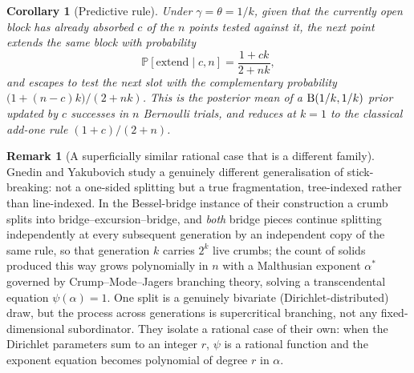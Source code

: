 \documentclass[11pt]{article}
\newcommand{\PP}{\mathbb{P}}
\theoremstyle{plain}
\newtheorem{corollary}[theorem]{Corollary}
\theoremstyle{definition}
\newtheorem{remark}[theorem]{Remark}
\begin{document}
\begin{corollary}[Predictive rule]
\label{cor:reciprocal-predictive}
Under \(\gamma=\theta=1/k\), given that the currently open block has already absorbed \(c\) of the \(n\) points tested against it, the next point extends the same block with probability
\[
\PP[\text{extend}\mid c,n]=\frac{1+ck}{2+nk},
\]
and escapes to test the next slot with the complementary probability \(\bigl(1+(n-c)k\bigr)/(2+nk)\). This is the posterior mean of a \({\rm B}(1/k,1/k)\) prior updated by \(c\) successes in \(n\) Bernoulli trials, and reduces at \(k=1\) to the classical add-one rule \((1+c)/(2+n)\).
\end{corollary}

\begin{remark}[A superficially similar rational case that is a different family]
\label{rem:gnedin-yakubovich}
Gnedin and Yakubovich \cite{gnedin2006recursive} study a genuinely different generalisation of stick-breaking: not a one-sided splitting but a true fragmentation, tree-indexed rather than line-indexed. In the Bessel-bridge instance of their construction a crumb splits into bridge--excursion--bridge, and \emph{both} bridge pieces continue splitting independently at every subsequent generation by an independent copy of the same rule, so that generation \(k\) carries \(2^k\) live crumbs; the count of solids produced this way grows polynomially in \(n\) with a Malthusian exponent \(\alpha^*\) governed by Crump--Mode--Jagers branching theory, solving a transcendental equation \(\psi(\alpha)=1\). One split is a genuinely bivariate (Dirichlet-distributed) draw, but the process across generations is supercritical branching, not any fixed-dimensional subordinator. They isolate a rational case of their own: when the Dirichlet parameters sum to an integer \(r\), \(\psi\) is a rational function and the exponent equation becomes polynomial of degree \(r\) in \(\alpha\).


\end{remark}
\end{document}
